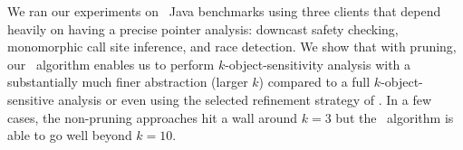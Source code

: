 We ran our experiments on \numBenchmarks\ Java benchmarks using three clients that
depend heavily on having a precise pointer analysis: downcast safety
checking, monomorphic call site inference, and race detection.
We show that with pruning, our \PR\ algorithm enables us to perform $k$-object-sensitivity
analysis with a substantially much finer abstraction (larger $k$)
compared to a full $k$-object-sensitive analysis or even using the selected
refinement strategy of \cite{liang11minimal}.
In a few cases, the non-pruning approaches hit a wall around $k=3$ but the \PR\
algorithm is able to go well beyond $k=10$.
